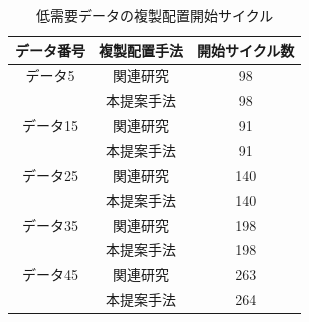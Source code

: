 \documentclass[11pt]{jreport}
\begin{document}
\begin{table}[H]
	\begin{center}
	\caption{低需要データの複製配置開始サイクル}
	\begin{tabular}{ | c | c | c | } \hline
	データ番号 & 複製配置手法 & 開始サイクル数 \\ \hline \hline
	データ5 & 関連研究 & 98 \\ \cline{2-3}
		     & 本提案手法 & 98 \\ \hline
	データ15 & 関連研究 & 91 \\ \cline{2-3}
		     & 本提案手法 & 91 \\ \hline
	データ25 & 関連研究 & 140 \\ \cline{2-3}
		     & 本提案手法 & 140 \\ \hline
	データ35 & 関連研究 & 198 \\ \cline{2-3}
		     & 本提案手法 & 198 \\ \hline
	データ45 & 関連研究 & 263 \\ \cline{2-3}
		     & 本提案手法 & 264 \\ \hline
	\end{tabular}
	\label{tab:counter}
	\end{center}
\end{table}
\end{document}
